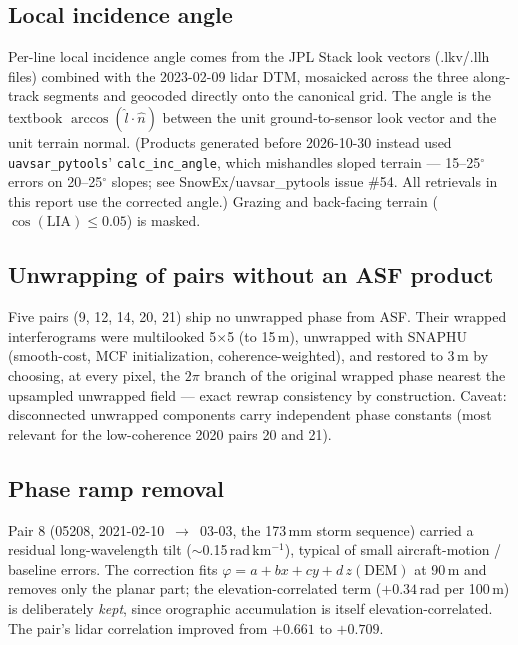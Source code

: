 \documentclass[11pt]{article}
\begin{document}
\subsection{Local incidence angle}
Per-line local incidence angle comes from the JPL Stack look vectors (.lkv/.llh files)
combined with the 2023-02-09 lidar DTM, mosaicked across the three along-track segments
and geocoded directly onto the canonical grid. The angle is the textbook
$\arccos(\hat{l}\cdot\hat{n})$ between the unit ground-to-sensor look vector and the unit
terrain normal. (Products generated before 2026-10-30 instead used
\texttt{uavsar\_pytools}' \texttt{calc\_inc\_angle}, which mishandles sloped terrain ---
15--25$^\circ$ errors on 20--25$^\circ$ slopes; see SnowEx/uavsar\_pytools issue \#54.
All retrievals in this report use the corrected angle.) Grazing and back-facing terrain
($\cos(\mathrm{LIA}) \le 0.05$) is masked.

\subsection{Unwrapping of pairs without an ASF product}
Five pairs (9, 12, 14, 20, 21) ship no unwrapped phase from ASF. Their wrapped
interferograms were multilooked 5$\times$5 (to 15\,m), unwrapped with SNAPHU
(smooth-cost, MCF initialization, coherence-weighted), and restored to 3\,m by choosing,
at every pixel, the $2\pi$ branch of the original wrapped phase nearest the upsampled
unwrapped field --- exact rewrap consistency by construction. Caveat: disconnected
unwrapped components carry independent phase constants (most relevant for the
low-coherence 2020 pairs 20 and 21).

\subsection{Phase ramp removal}
Pair 8 (05208, 2021-02-10~$\to$~03-03, the 173\,mm storm sequence) carried a residual
long-wavelength tilt ($\sim$0.15\,rad\,km$^{-1}$), typical of small aircraft-motion /
baseline errors. The correction fits $\varphi = a + bx + cy + d\,z(\mathrm{DEM})$ at
90\,m and removes only the planar part; the elevation-correlated term
($+0.34$\,rad per 100\,m) is deliberately \emph{kept}, since orographic accumulation is
itself elevation-correlated. The pair's lidar correlation improved from $+0.661$ to
$+0.709$.
\end{document}
